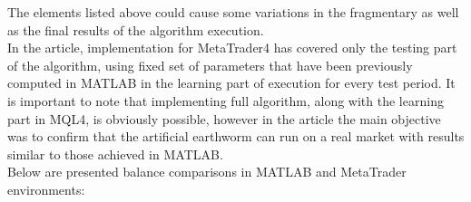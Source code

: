 \documentclass[runningheads,a4paper]{llncs}
\begin{document}
The elements listed above could cause some variations in the fragmentary as well as the final results of the algorithm execution.\\

In the article, implementation for MetaTrader4 has covered only the testing part of the algorithm, using fixed set of parameters that have been previously computed in MATLAB in the learning part of execution for every test period. It is important to note that implementing full algorithm, along with the learning part in MQL4, is obviously possible, however in the article the main objective was to confirm that the artificial earthworm can run on a real market with results similar to those achieved in MATLAB.\\

Below are presented balance comparisons in MATLAB and MetaTrader environments:
\end{document}
